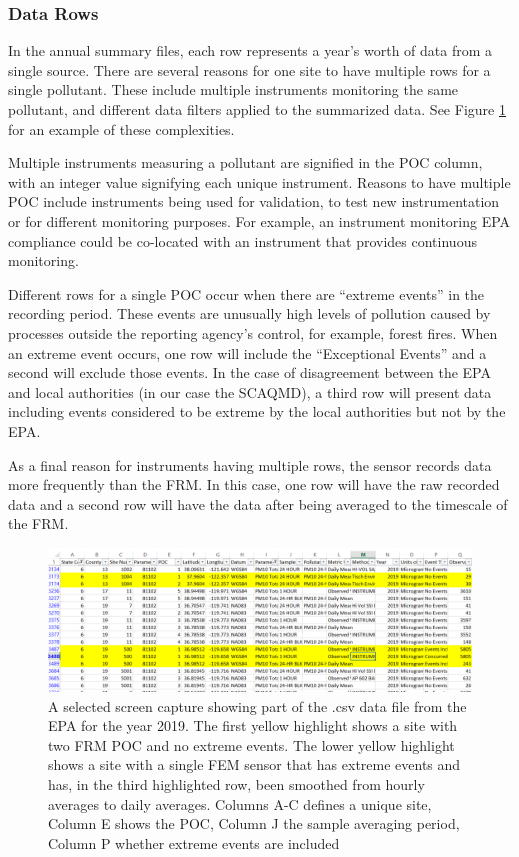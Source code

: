 \documentclass{article}
\begin{document}
\subsubsection*{Data Rows} \label{subsubsec:DataRows}
In the annual summary files, each row represents a year's worth of data from a single source. There are several reasons for one site to have multiple rows for a single pollutant.  These include multiple instruments monitoring the same pollutant, and different data filters applied to the summarized data.  See Figure  \ref{fig:Example_Raw_EPA_Data} for an example of these complexities.

Multiple instruments measuring a pollutant are signified in the \ac{POC} column, with an integer value signifying each unique instrument.  Reasons to have multiple \ac{POC} include instruments being used for validation, to test new instrumentation or for different monitoring purposes.  For example, an instrument monitoring \ac{EPA} compliance could be co-located with an instrument that provides continuous monitoring.

Different rows for a single \ac{POC} occur when there are ``extreme events'' in the recording period.  These events are unusually high levels of pollution caused by processes outside the reporting agency's control, for example, forest fires.  When an extreme event occurs, one row will include the ``Exceptional Events'' and a second will exclude those events.  In the case of disagreement between the \ac{EPA} and local authorities (in our case the \ac{SCAQMD}), a third row will present data including events considered to be extreme by the local authorities but not by the \ac{EPA}.

As a final reason for instruments having multiple rows, the sensor records data more frequently than the \ac{FRM}.  In this case, one row will have the raw recorded data and a second row will have the data after being averaged to the timescale of the \ac{FRM}.  

\begin{figure}[ht]
	\centering
	\includegraphics[width = \textwidth]{Figures/Validation/Example_Raw_EPA_Data.png}
	\caption{A selected screen capture showing part of the .csv data file from the EPA for the year 2019.  The first yellow highlight shows a site with two \ac{FRM} \ac{POC} and no extreme events.  The lower yellow highlight shows a site with a single \ac{FEM} sensor that has extreme events and has, in the third highlighted row, been smoothed from hourly averages to daily averages.  Columns A-C defines a unique site, Column E shows the \ac{POC}, Column J the sample averaging period, Column P whether extreme events are included}
	\label{fig:Example_Raw_EPA_Data}
\end{figure}
\end{document}
